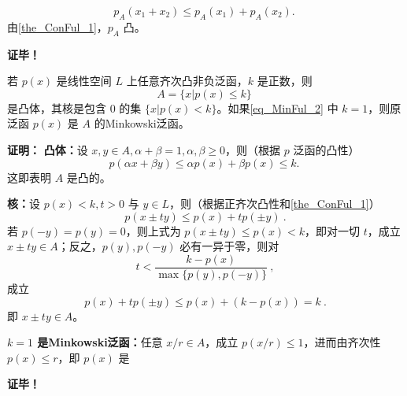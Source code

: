  \begin{equation}
p_A(x_1+x_2)\leq p_A(x_1)+p_A(x_2).~
 \end{equation}
 由\autoref{the_ConFul_1}，$p_A$ 凸。








\textbf{证毕！}

\begin{theorem}{}
若 $p(x)$ 是线性空间 $L$ 上任意齐次凸非负泛函，$k$ 是正数，则
\begin{equation}\label{eq_MinFul_2}
A=\{x|p(x)\leq k\}~
\end{equation}
是凸体，其核是包含 $0$ 的集 $\{x|p(x)<k\}$。如果\autoref{eq_MinFul_2} 中 $k=1$，则原泛函 $p(x)$ 是 $A$ 的Minkowski泛函。
\end{theorem}

\textbf{证明：}
\textbf{凸体：}设 $x,y\in A,\alpha+\beta=1,\alpha,\beta\geq0$，则（根据 $p$ 泛函的凸性）
\begin{equation}
p(\alpha x+\beta y)\leq\alpha p(x)+\beta p(x)\leq k.~
\end{equation}
这即表明 $A$ 是凸的。

\textbf{核：}设 $p(x)<k,t>0$ 与 $y\in L$，则（根据正齐次凸性和\autoref{the_ConFul_1}）
\begin{equation}
p(x\pm ty)\leq p(x)+tp(\pm y)~.
\end{equation}
若 $p(-y)=p(y)=0$，则上式为 $p(x\pm ty)\leq p(x)<k$，即对一切 $t$，成立 $x\pm ty\in A$；反之，$p(y),p(-y)$ 必有一异于零，则对
\begin{equation}
t<\frac{k-p(x)}{\max\{p(y),p(-y)\}}~,
\end{equation}
成立
\begin{equation}
p(x)+tp(\pm y)\leq p(x)+(k-p(x))=k~.
\end{equation}
即 $x\pm ty\in A$。

\textbf{$k=1$ 是Minkowski泛函：}任意 $x/r\in A$，成立 $p(x/r)\leq 1$，进而由齐次性 $p(x)\leq r$，即 $p(x)$ 是

\textbf{证毕！}
